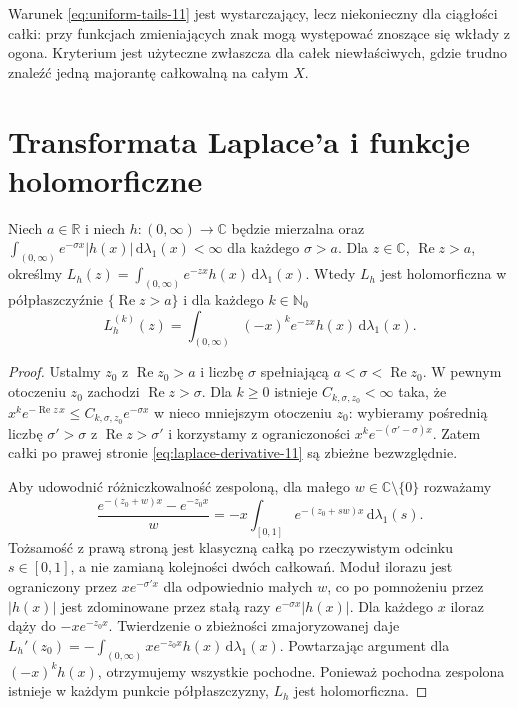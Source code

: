 \begin{uwaga}
Warunek \eqref{eq:uniform-tails-11} jest wystarczający, lecz
niekonieczny dla ciągłości całki: przy funkcjach zmieniających
znak mogą występować znoszące się wkłady z ogona.
Kryterium jest użyteczne zwłaszcza dla całek niewłaściwych,
gdzie trudno znaleźć jedną majorantę całkowalną na całym $X$.
\end{uwaga}

\section{Transformata Laplace'a i funkcje holomorficzne}

\begin{twierdzenie}
\label{thm:laplace-holo-11}
Niech $a\in\mathbb R$ i niech $h:(0,\infty)\to\mathbb C$
będzie mierzalna oraz
$\int_{(0,\infty)}e^{-\sigma x}|h(x)|\,\mathrm d\lambda_1(x)<\infty$
dla każdego $\sigma>a$. Dla $z\in\mathbb C$,
$\operatorname{Re}z>a$, określmy
$L_h(z)=\int_{(0,\infty)}e^{-zx}h(x)\,\mathrm d\lambda_1(x)$.
Wtedy $L_h$ jest holomorficzna w półpłaszczyźnie
$\{\operatorname{Re}z>a\}$ i dla każdego $k\in\mathbb N_0$
\begin{equation}\label{eq:laplace-derivative-11}
L_h^{(k)}(z)=\int_{(0,\infty)}(-x)^k e^{-zx}h(x)
\,\mathrm d\lambda_1(x).
\end{equation}
\end{twierdzenie}
\begin{proof}
Ustalmy $z_0$ z $\operatorname{Re}z_0>a$ i liczbę
$\sigma$ spełniającą $a<\sigma<\operatorname{Re}z_0$.
W pewnym otoczeniu $z_0$ zachodzi $\operatorname{Re}z>\sigma$.
Dla $k\ge0$ istnieje $C_{k,\sigma,z_0}<\infty$ taka, że
$x^k e^{-\operatorname{Re}z\,x}\le
C_{k,\sigma,z_0}e^{-\sigma x}$ w nieco mniejszym
otoczeniu $z_0$: wybieramy pośrednią liczbę
$\sigma'>\sigma$ z $\operatorname{Re}z>\sigma'$
i korzystamy z ograniczoności $x^ke^{-(\sigma'-\sigma)x}$.
Zatem całki po prawej stronie
\eqref{eq:laplace-derivative-11} są zbieżne bezwzględnie.

Aby udowodnić różniczkowalność zespoloną, dla małego
$w\in\mathbb C\setminus\{0\}$ rozważamy
\[
\frac{e^{-(z_0+w)x}-e^{-z_0x}}{w}
=-x\int_{[0,1]}e^{-(z_0+sw)x}\,\mathrm d\lambda_1(s).
\]
Tożsamość z prawą stroną jest klasyczną
całką po rzeczywistym odcinku $s\in[0,1]$,
a nie zamianą kolejności dwóch całkowań.
Moduł ilorazu jest ograniczony przez
$x e^{-\sigma'x}$ dla odpowiednio małych $w$,
co po pomnożeniu przez $|h(x)|$ jest zdominowane
przez stałą razy $e^{-\sigma x}|h(x)|$.
Dla każdego $x$ iloraz dąży do $-xe^{-z_0x}$.
Twierdzenie o zbieżności zmajoryzowanej daje
$L_h'(z_0)=-\int_{(0,\infty)}xe^{-z_0x}h(x)
\,\mathrm d\lambda_1(x)$. Powtarzając argument dla
$(-x)^kh(x)$, otrzymujemy wszystkie pochodne.
Ponieważ pochodna zespolona istnieje w każdym punkcie
półpłaszczyzny, $L_h$ jest holomorficzna.
\end{proof}

